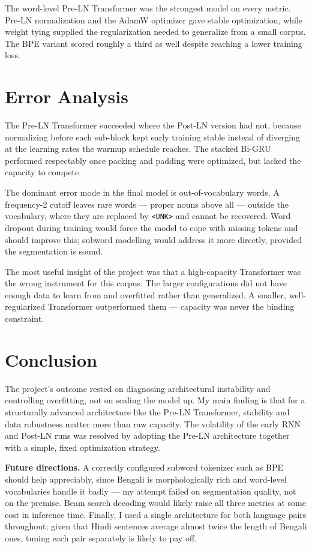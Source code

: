 \documentclass[11pt, oneside]{article}
\begin{document}
The word-level Pre-LN Transformer was the strongest model on every metric. Pre-LN
normalization and the AdamW optimizer gave stable optimization, while weight tying supplied
the regularization needed to generalize from a small corpus. The BPE variant scored roughly a
third as well despite reaching a lower training loss.

\section{Error Analysis}

The Pre-LN Transformer succeeded where the Post-LN version had not, because normalizing
before each sub-block kept early training stable instead of diverging at the learning rates
the warmup schedule reaches. The stacked Bi-GRU performed respectably once packing and
padding were optimized, but lacked the capacity to compete.

The dominant error mode in the final model is out-of-vocabulary words. A frequency-2 cutoff
leaves rare words --- proper nouns above all --- outside the vocabulary, where they are
replaced by \texttt{<UNK>} and cannot be recovered. Word dropout during training would force
the model to cope with missing tokens and should improve this; subword modelling would
address it more directly, provided the segmentation is sound.

The most useful insight of the project was that a high-capacity Transformer was the wrong
instrument for this corpus. The larger configurations did not have enough data to learn from
and overfitted rather than generalized. A smaller, well-regularized Transformer outperformed
them --- capacity was never the binding constraint.

\section{Conclusion}

The project's outcome rested on diagnosing architectural instability and controlling
overfitting, not on scaling the model up. My main finding is that for a structurally advanced
architecture like the Pre-LN Transformer, stability and data robustness matter more than raw
capacity. The volatility of the early RNN and Post-LN runs was resolved by adopting the Pre-LN
architecture together with a simple, fixed optimization strategy.

\textbf{Future directions.} A correctly configured subword tokenizer such as BPE should help
appreciably, since Bengali is morphologically rich and word-level vocabularies handle it
badly --- my attempt failed on segmentation quality, not on the premise. Beam search decoding
would likely raise all three metrics at some cost in inference time. Finally, I used a single
architecture for both language pairs throughout; given that Hindi sentences average almost
twice the length of Bengali ones, tuning each pair separately is likely to pay off.
\end{document}
